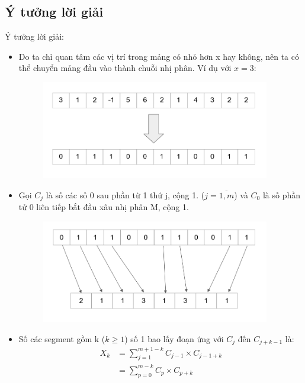 \documentclass[../report.tex]{subfiles}
\begin{document}
\subsection{Ý tưởng lời giải}
Ý tưởng lời giải: 
\begin{itemize}
    \item Do ta chỉ quan tâm các vị trí trong mảng có nhỏ hơn x 
        hay không, nên ta có thể chuyển 
        mảng đầu vào thành chuỗi nhị phân. 
        Ví dụ với $x = 3$:
    \begin{figure}[H]
    \centering
    \includegraphics[width=10cm]{figures/convert-to-binary.png}
    \end{figure}

\item Gọi $C_j$ là số các số 0 sau phần từ 1 thứ j, cộng 1. 
    ($j = \overline{1, m}$) và $C_0$ là số 
    phần tử 0 liên tiếp bắt đầu xâu nhị phân M, cộng 1. 
    \begin{figure}[H]
    \centering
    \includegraphics[width=10cm]{figures/C_j.png}
    \end{figure}

\item Số các segment gồm k ($k \ge 1$) số 1 bao lấy đoạn ứng với $C_j$ đến 
    $C_{j + k - 1}$ là: 
\begin{align*}
    X_k &= \sum_{j = 1}^{m + 1 - k} C_{j - 1} \times C_{j - 1 + k}  \\
    &= \sum_{p = 0}^{m - k} C_{p} \times C_{p + k} 
\end{align*}\\


\end{itemize}
\end{document}
